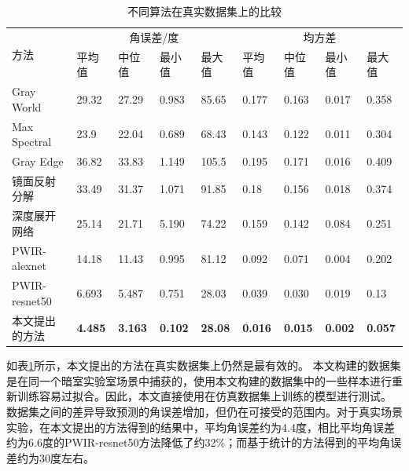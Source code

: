 \documentclass[
    type = master, %
    degree = academic,        %
    decl-page,  %
  ]{njuthesis}
\begin{document}
\begin{table}[h]
\centering                %
\caption{不同算法在真实数据集上的比较} 
\label{tab:illu real}
\begin{tabular}{l|llll llll}
\hline
\multirow{2}{*}{方法} & \multicolumn{4}{c}{角误差/度}                                           & \multicolumn{4}{c}{均方差}                                           \\
                    & 平均值            & 中位值            & 最小值            & 最大值            & 平均值            & 中位值            & 最小值            & 最大值            \\ \hline
Gray World          & 29.32          & 27.29          & 0.983          & 85.65          & 0.177          & 0.163          & 0.017          & 0.358          \\
Max Spectral            & 23.9           & 22.04          & 0.689          & 68.43          & 0.143          & 0.122          & 0.011          & 0.304          \\
Gray Edge           & 36.82          & 33.83          & 1.149          & 105.5          & 0.195          & 0.171          & 0.016          & 0.409          \\
镜面反射分解                & 33.49          & 31.37          & 1.071          & 91.85          & 0.18           & 0.156          & 0.018          & 0.374          \\
深度展开网络               & 25.14          & 21.71          & 5.190          & 74.22          & 0.159          & 0.142          & 0.084          & 0.251          \\
PWIR-alexnet        & 14.18          & 11.43          & 0.995          & 81.12          & 0.092          & 0.071          & 0.004          & 0.202          \\    
PWIR-resnet50   & 6.693          & 5.487          & 0.751          & 28.03          & 0.039          & 0.030          & 0.019          & 0.13           \\
本文提出的方法                 & \textbf{4.485} & \textbf{3.163} & \textbf{0.102} & \textbf{28.08} & \textbf{0.016} & \textbf{0.015} & \textbf{0.002} & \textbf{0.057} \\ \hline
\end{tabular}
\end{table}

如表\ref{tab:illu real}所示，本文提出的方法在真实数据集上仍然是最有效的。 本文构建的数据集是在同一个暗室实验室场景中捕获的，使用本文构建的数据集中的一些样本进行重新训练容易过拟合。因此，本文直接使用在仿真数据集上训练的模型进行测试。 数据集之间的差异导致预测的角误差增加，但仍在可接受的范围内。对于真实场景实验，在本文提出的方法得到的结果中，平均角误差约为4.4度，相比平均角误差约为6.6度的PWIR-resnet50方法降低了约32\%；而基于统计的方法得到的平均角误差约为30度左右。
\end{document}

